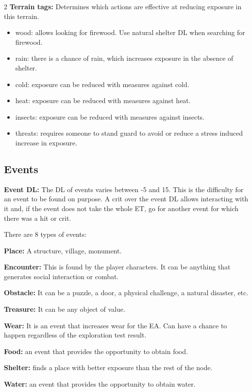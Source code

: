 \begin{multicols}{2}
\textbf{Terrain tags:} Determines which actions are effective at reducing exposure in this terrain.
\begin{itemize}
    \item wood: allows looking for firewood. Use natural shelter DL when searching for firewood.
    \item rain: there is a chance of rain, which increases exposure in the absence of shelter.
    \item cold: exposure can be reduced with measures against cold.
    \item heat: exposure can be reduced with measures against heat.
    \item insects: exposure can be reduced with measures against insects.
    \item threats: requires someone to stand guard to avoid or reduce a stress induced increase in exposure.
\end{itemize}


\subsection{Events}

\textbf{Event DL:} The DL of events varies between -5 and 15. This is the difficulty for an event to be found on purpose. A crit over the event DL allows interacting with it and, if the event does not take the whole ET, go for another event for which there was a hit or crit. 

There are 8 types of events:

\begin{proplist}
    \item \textbf{Place:} A structure, village, monument.
    \item \textbf{Encounter:} This is found by the player characters. It can be anything that generates social interaction or combat.
    \item \textbf{Obstacle:} It can be a puzzle, a door, a physical challenge, a natural disaster, etc.
    \item \textbf{Treasure:} It can be any object of value.
    \item \textbf{Wear:} It is an event that increases wear for the EA. Can have a chance to happen regardless of the exploration test result.
    \item \textbf{Food:} an event that provides the opportunity to obtain food.
    \item \textbf{Shelter:} finds a place with better exposure than the rest of the node.
    \item \textbf{Water:} an event that provides the opportunity to obtain water.
\end{proplist}


\end{multicols}
